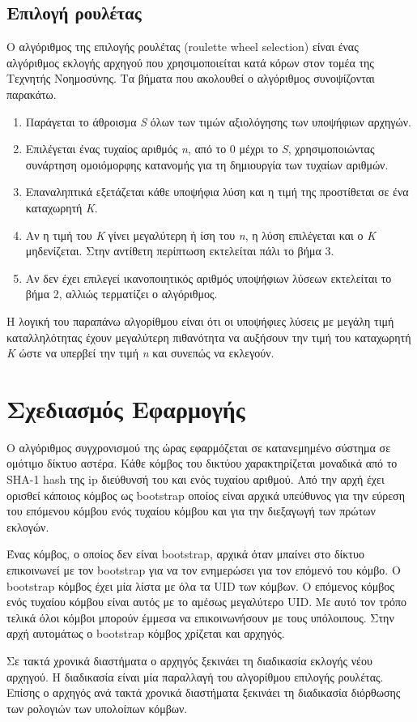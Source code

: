 \documentclass{article}
\begin{document}
\subsection{Επιλογή ρουλέτας}
Ο αλγόριθμος της επιλογής ρουλέτας (roulette wheel selection) είναι ένας
αλγόριθμος εκλογής αρχηγού που χρησιμοποιείται κατά κόρων στον τομέα της
Τεχνητής Νοημοσύνης. Τα βήματα που ακολουθεί ο αλγόριθμος συνοψίζονται παρακάτω.
\begin{enumerate}
    \item Παράγεται το άθροισμα \emph{S} όλων των τιμών αξιολόγησης των
υποψήφιων αρχηγών.
    \item Επιλέγεται ένας τυχαίος αριθμός \emph{n}, από το 0 μέχρι το \emph{S},
χρησιμοποιώντας συνάρτηση ομοιόμορφης κατανομής για τη δημιουργία των τυχαίων
αριθμών.
    \item Επαναληπτικά εξετάζεται κάθε υποψήφια λύση και η τιμή της προστίθεται
σε ένα καταχωρητή \emph{K}.
    \item Αν η τιμή του \emph{K} γίνει μεγαλύτερη ή ίση του \emph{n}, η λύση
επιλέγεται και ο \emph{K} μηδενίζεται. Στην αντίθετη περίπτωση εκτελείται πάλι
το βήμα 3.
    \item Αν δεν έχει επιλεγεί ικανοποιητικός αριθμός υποψήφιων λύσεων
εκτελείται το βήμα 2, αλλιώς τερματίζει ο αλγόριθμος.
\end{enumerate}

Η λογική του παραπάνω αλγορίθμου είναι ότι οι υποψήφιες λύσεις με μεγάλη τιμή
καταλληλότητας έχουν μεγαλύτερη πιθανότητα να αυξήσουν την τιμή του καταχωρητή
\emph{K} ώστε να υπερβεί την τιμή \emph{n} και συνεπώς να εκλεγούν.

\section{Σχεδιασμός Εφαρμογής}
Ο αλγόριθμος συγχρονισμού της ώρας εφαρμόζεται σε κατανεμημένο σύστημα σε
ομότιμο δίκτυο αστέρα. Κάθε κόμβος του δικτύου χαρακτηρίζεται μοναδικά από 
το SHA-1 hash της ip διεύθυνσή του και ενός τυχαίου αριθμού. Από την αρχή έχει
ορισθεί κάποιος κόμβος ως bootstrap οποίος είναι αρχικά υπεύθυνος για την
εύρεση του επόμενου κόμβου ενός τυχαίου κόμβου και για την διεξαγωγή των πρώτων
εκλογών.

Ένας κόμβος, ο οποίος δεν είναι bootstrap, αρχικά όταν μπαίνει στο δίκτυο
επικοινωνεί με τον bootstrap για να τον ενημερώσει για τον επόμενό του κόμβο. Ο
bootstrap κόμβος έχει μία λίστα με όλα τα UID των κόμβων. Ο επόμενος κόμβος ενός
τυχαίου κόμβου είναι αυτός με το αμέσως μεγαλύτερο UID. Με αυτό τον τρόπο τελικά
όλοι κόμβοι μπορούν έμμεσα να επικοινωνήσουν με τους υπόλοιπους. Στην αρχή
αυτομάτως ο bootstrap κόμβος χρίζεται και αρχηγός.

Σε τακτά χρονικά διαστήματα ο αρχηγός ξεκινάει τη διαδικασία εκλογής νέου
αρχηγού. Η διαδικασία είναι μία παραλλαγή του αλγορίθμου επιλογής ρουλέτας.
Επίσης ο αρχηγός ανά τακτά χρονικά διαστήματα ξεκινάει τη διαδικασία διόρθωσης
των ρολογιών των υπολοίπων κόμβων.
\end{document}
